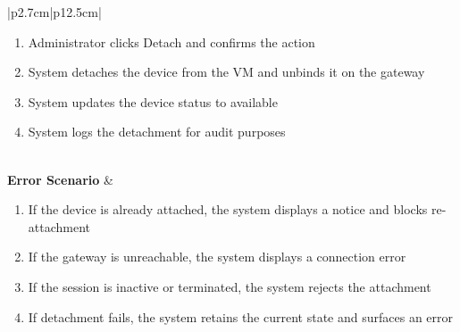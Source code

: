 \begin{table}[H]
\begin{tabular}{|p{2.7cm}|p{12.5cm}|}
\begin{minipage}[t]{\linewidth}
\begin{enumerate}[topsep=0pt,itemsep=1pt,parsep=0pt,partopsep=0pt]
                                            \item Administrator clicks Detach and confirms the action
                                            \item System detaches the device from the VM and unbinds it on the gateway
                                            \item System updates the device status to available
                                            \item System logs the detachment for audit purposes
                                        \end{enumerate}
                                    \end{minipage} \\
        \hline
        \textbf{Error Scenario} & \begin{minipage}[t]{\linewidth}
                                        \begin{enumerate}[topsep=0pt,itemsep=1pt,parsep=0pt,partopsep=0pt]
                                            \item If the device is already attached, the system displays a notice and blocks re-attachment
                                            \item If the gateway is unreachable, the system displays a connection error
                                            \item If the session is inactive or terminated, the system rejects the attachment
                                            \item If detachment fails, the system retains the current state and surfaces an error
                                        \end{enumerate}
                                    \end{minipage} \\
        \hline
    \end{tabular}
    \label{tab:admin-attach-detach-device}
\end{table}
